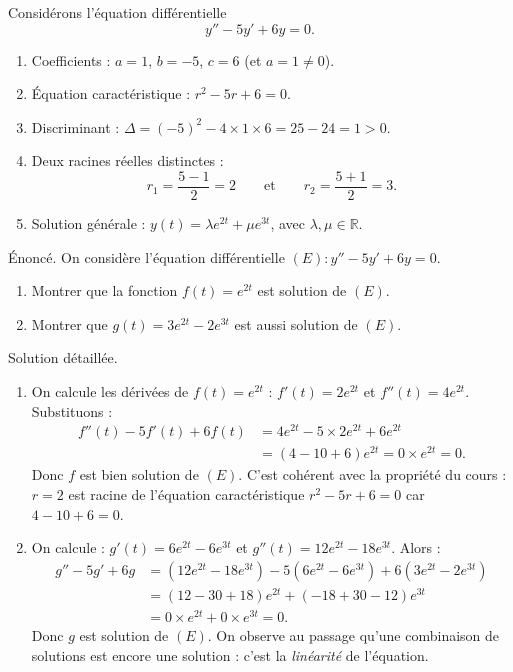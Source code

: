\documentclass[11pt]{article}
\begin{document}
\begin{exemplebox}
Considérons l'équation différentielle
\[ y'' - 5y' + 6y = 0. \]
\begin{enumerate}
\item Coefficients : $a = 1$, $b = -5$, $c = 6$ (et $a = 1 \neq 0$).
\item Équation caractéristique : $r^2 - 5r + 6 = 0$.
\item Discriminant : $\Delta = (-5)^2 - 4 \times 1 \times 6 = 25 - 24 = 1 > 0$.
\item Deux racines réelles distinctes :
\[ r_1 = \frac{5 - 1}{2} = 2 \qquad \text{et} \qquad r_2 = \frac{5 + 1}{2} = 3. \]
\item Solution générale : $y(t) = \lambda e^{2t} + \mu e^{3t}$, avec $\lambda, \mu \in \mathbb{R}$.
\end{enumerate}
\end{exemplebox}

\begin{exoresolu}
Énoncé. On considère l'équation différentielle $(E) : y'' - 5y' + 6y = 0$.
\begin{enumerate}
\item Montrer que la fonction $f(t) = e^{2t}$ est solution de $(E)$.
\item Montrer que $g(t) = 3e^{2t} - 2e^{3t}$ est aussi solution de $(E)$.
\end{enumerate}
\tcblower
Solution détaillée.
\begin{enumerate}
\item On calcule les dérivées de $f(t) = e^{2t}$ : $f'(t) = 2e^{2t}$ et $f''(t) = 4e^{2t}$. Substituons :
\begin{align*}
f''(t) - 5f'(t) + 6f(t) &= 4e^{2t} - 5 \times 2e^{2t} + 6e^{2t} \\
&= (4 - 10 + 6)e^{2t} = 0 \times e^{2t} = 0.
\end{align*}
Donc $f$ est bien solution de $(E)$. C'est cohérent avec la propriété du cours : $r = 2$ est racine de l'équation caractéristique $r^2 - 5r + 6 = 0$ car $4 - 10 + 6 = 0$.
\item On calcule : $g'(t) = 6e^{2t} - 6e^{3t}$ et $g''(t) = 12e^{2t} - 18e^{3t}$. Alors :
\begin{align*}
g'' - 5g' + 6g &= \left(12e^{2t} - 18e^{3t}\right) - 5\left(6e^{2t} - 6e^{3t}\right) + 6\left(3e^{2t} - 2e^{3t}\right) \\
&= (12 - 30 + 18)e^{2t} + (-18 + 30 - 12)e^{3t} \\
&= 0 \times e^{2t} + 0 \times e^{3t} = 0.
\end{align*}
Donc $g$ est solution de $(E)$. On observe au passage qu'une combinaison de solutions est encore une solution : c'est la \emph{linéarité} de l'équation.
\end{enumerate}
\end{exoresolu}
\end{document}
